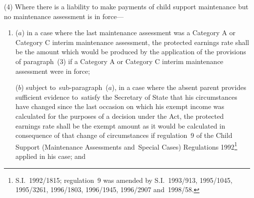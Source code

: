 \documentclass[12pt,a4paper]{article}
\begin{document}
{%
%
%

(4) Where there is a liability to make payments of child support maintenance but no maintenance assessment is in force—
\begin{enumerate}\item[]
($a$) in a case where the last maintenance assessment was a Category A or Category C interim maintenance assessment, the protected earnings rate shall be the amount which would be produced by the application of the provisions of paragraph~(3) if a Category A or Category C interim maintenance assessment were in force;

($b$) subject to~sub-paragraph~($a$), in a case where the absent parent provides sufficient evidence to~satisfy the Secretary of State that his circumstances have changed since the last occasion on which his exempt income was calculated for the purposes of a decision under the Act, the protected earnings rate shall be the exempt amount as it would be calculated in consequence of that change of circumstances if regulation~9 of the Child Support (Maintenance Assessments and~Special Cases) Regulations 1992\footnote{\frenchspacing S.I.~1992/1815; regulation~9 was amended by S.I.~1993/913, 1995/1045, 1995/3261, 1996/1803, 1996/1945, 1996/2907 and~1998/58.} applied in his case; and


\end{enumerate}}
\end{document}

